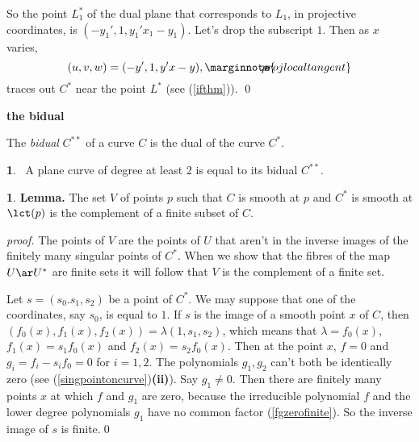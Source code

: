 \documentclass[leqno]{book}
\newcommand\Marginnote[1]{\marginnote{\hspace{-12pt}\normalfont{#1}}}
\renewcommand\theequation{\thesection.\arabic{equation}}
\newenvironment{boldequation}{\renewcommand\theequation{\textbf{\thesection.\arabic{equation}}}\equation}
   {\endequation}
\theoremstyle{definition}%
\numberwithin{equation}{section}
\theoremstyle{theorem} %
\newtheorem{lemma}[equation]{}
\newtheorem{theorem}[equation]{}
\renewenvironment{proof}{\no \emph{proof.}}{}
\begin{document}
So the point $L_1^*$ of the dual plane that corresponds to $L_1$, in
projective coordinates, is $(-y_1',1,y_1'x_1-y_1)$.  Let's drop the
subscript $1$.  Then as $x$ varies,
\begin{equation}
(u,v,w) = (-y',1,y'x-y),
\Marginnote{projlocaltangent}
	\label{projlocaltangent}
\end{equation}
traces out $C^*$ near the point $L^*$ (see (\ref{ifthm})). \qed

\bs
\begin{boldequation}
\Marginnote{bidualone}\label{bidualone}
 \hspace{-11cm} 
\textbf{the bidual}
\end{boldequation}


The {\it {bidual}} $C^{**}$ of a curve $C$ is the dual of
the curve  $C^*$.

\begin{theorem}{} \Marginnote{bidualC}\;\,
A plane curve of degree at least $2$ is equal to its bidual $C^{**}$.
\label{bidualC} \end{theorem}

\begin{lemma}{\bf Lemma.}\Marginnote{vopen}\;
The set $V$ of points $p$ such that $C$ is smooth at $p$ and $C^*$ is
smooth at $\lct(p)$ is the complement of a finite subset of $C$.
\label{vopen}\end{lemma}

\begin{proof}   
The points of $V$ are the points of $U$ that aren't in the inverse
images of the finitely many singular points of $C^*$.  When we show
that the fibres of the map $U \ar U^*$ are finite sets it will follow
that $V$ is the complement of a finite set.

Let $s=(s_0.s_1,s_2)$ be a point of $C^*$.  We may suppose that one of
the coordinates, say $s_0$, is equal to $1$.  If $s$ is the image of a
smooth point $x$ of $C$, then $(f_0(x),f_1(x),f_2(x))= \lambda
(1,s_1,s_2) $, which means that $\lambda = f_0(x)$, $f_1(x) =
s_1f_0(x)$ and $f_2(x) = s_2f_0(x)$.  Then at the point $x$, $f=0$ and
$g_i = f_i-s_if_0 = 0$ for $i=1,2$.  The polynomials $g_1,g_2$ can't
both be identically zero (see (\ref{singpointoncurve}){\bf (ii)}).
Say $g_1\neq 0$.  Then there are finitely many points $x$ at which $f$
and $g_1$ are zero, because the irreducible polynomial $f$ and the
lower degree polynomials $g_1$ have no common factor
(\ref{fgzerofinite}).  So the inverse image of $s$ is
finite.\qed\end{proof}
\end{document}
